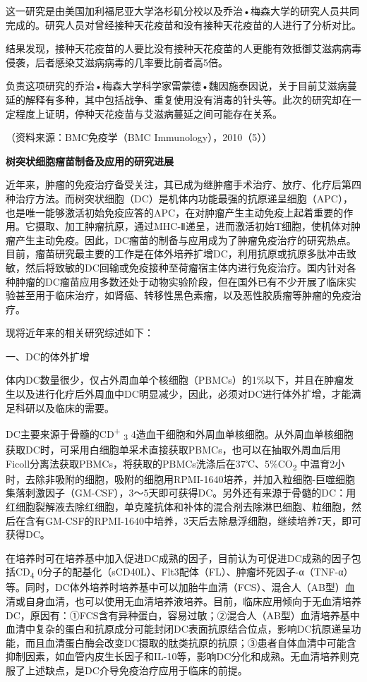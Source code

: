 这一研究是由美国加利福尼亚大学洛杉矶分校以及乔治•梅森大学的研究人员共同完成的。研究人员对曾经接种天花疫苗和没有接种天花疫苗的人进行了分析对比。

结果发现，接种天花疫苗的人要比没有接种天花疫苗的人更能有效抵御艾滋病病毒侵袭，后者感染艾滋病病毒的几率要比前者高5倍。

负责这项研究的乔治•梅森大学科学家雷蒙德•魏因施泰因说，关于目前艾滋病蔓延的解释有多种，其中包括战争、重复使用没有消毒的针头等。此次的研究却在一定程度上证明，停种天花疫苗与艾滋病蔓延之间可能存在关系。

（资料来源：BMC免疫学（BMC Immunology），2010（5））

\begin{center}
 \textbf{\Large 树突状细胞瘤苗制备及应用的研究进展}
 \end{center}

近年来，肿瘤的免疫治疗备受关注，其已成为继肿瘤手术治疗、放疗、化疗后第四种治疗方法。而树突状细胞（DC）是机体内功能最强的抗原递呈细胞（APC），也是唯一能够激活初始免疫应答的APC，在对肿瘤产生主动免疫上起着重要的作用。它摄取、加工肿瘤抗原，通过MHC-Ⅱ递呈，进而激活初始T细胞，使机体对肿瘤产生主动免疫。因此，DC瘤苗的制备与应用成为了肿瘤免疫治疗的研究热点。目前，瘤苗研究最主要的工作是在体外培养扩增DC，利用抗原或抗原多肽冲击致敏，然后将致敏的DC回输或免疫接种至荷瘤宿主体内进行免疫治疗。国内针对各种肿瘤的DC瘤苗应用多数还处于动物实验阶段，但在国外已有不少开展了临床实验甚至用于临床治疗，如肾癌、转移性黑色素瘤，以及恶性胶质瘤等肿瘤的免疫治疗。

现将近年来的相关研究综述如下：

\begin{center}
 {\large 一、DC的体外扩增}
 \end{center}

体内DC数量很少，仅占外周血单个核细胞（PBMCs）的1\%以下，并且在肿瘤发生以及进行化疗后外周血中DC明显减少，因此，必须对DC进行体外扩增，才能满足科研以及临床的需要。

DC主要来源于骨髓的CD\textsuperscript{+} \textsubscript{3}
4造血干细胞和外周血单核细胞。从外周血单核细胞获取DC时，可采用白细胞单采术直接获取PBMCs，也可以在抽取外周血后用Ficoll分离法获取PBMCs，将获取的PBMCs洗涤后在37℃、5\%CO\textsubscript{2}
中温育2小时，去除非吸附的细胞，吸附的细胞用RPMI-1640培养，并加入粒细胞-巨噬细胞集落刺激因子（GM-CSF），3～5天即可获得DC。另外还有来源于骨髓的DC：用红细胞裂解液去除红细胞，单克隆抗体和补体的混合剂去除淋巴细胞、粒细胞，然后在含有GM-CSF的RPMI-1640中培养，3天后去除悬浮细胞，继续培养7天，即可获得DC。

在培养时可在培养基中加入促进DC成熟的因子，目前认为可促进DC成熟的因子包括CD\textsubscript{4}
0分子的配基化（sCD40L）、Flt3配体（FL）、肿瘤坏死因子-α（TNF-α）等。同时，DC体外培养时培养基中可以加胎牛血清（FCS）、混合人（AB型）血清或自身血清，也可以使用无血清培养液培养。目前，临床应用倾向于无血清培养DC，原因有：①FCS含有异种蛋白，容易过敏；②混合人（AB型）血清培养基中血清中复杂的蛋白和抗原成分可能封闭DC表面抗原结合位点，影响DC抗原递呈功能，而且血清蛋白酶会改变DC摄取的肽类抗原的抗原；③患者自体血清中可能含抑制因素，如血管内皮生长因子和IL-10等，影响DC分化和成熟。无血清培养则克服了上述缺点，是DC介导免疫治疗应用于临床的前提。

